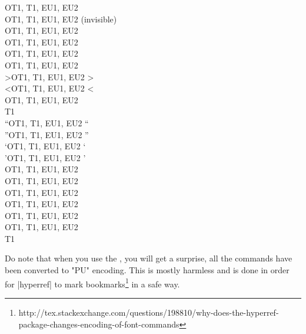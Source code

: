 \begin{tabbing}
\ttverb\textbraceright    \>OT1, T1, EU1, EU2\>   \textbraceright  \>  \\
\ttverb\textcompwordmark  \>OT1, T1, EU1, EU2\>   \textcompwordmark\> (invisible) \\
\ttverb\textdollar        \>OT1, T1, EU1, EU2\>   \textdollar      \>  \\
\ttverb\textemdash        \>OT1, T1, EU1, EU2\>   \textemdash      \>  \\
\ttverb\textendash        \>OT1, T1, EU1, EU2\>   \textendash      \>  \\
\ttverb\textexclamdown    \>OT1, T1, EU1, EU2\>   \textexclamdown  \>  \\
\ttverb\textgreater       \>OT1, T1, EU1, EU2\>   \textgreater     \>  \\
\ttverb\textless          \>OT1, T1, EU1, EU2\>   \textless        \>  \\
\ttverb\textquestiondown  \>OT1, T1, EU1, EU2\>   \textquestiondown\>  \\
\ttverb\textquotedbl      \>T1    \>   \textquotedbl    \>  \\
\ttverb\textquotedblleft  \>OT1, T1, EU1, EU2\>   \textquotedblleft\>  \\
\ttverb\textquotedblright \>OT1, T1, EU1, EU2\>   \textquotedblright\> \\
\ttverb\textquoteleft     \>OT1, T1, EU1, EU2\>   \textquoteleft   \>  \\
\ttverb\textquoteright    \>OT1, T1, EU1, EU2\>   \textquoteright  \>  \\
\ttverb\textregistered    \>OT1, T1, EU1, EU2\>   \textregistered  \>  \\
\ttverb\textsection       \>OT1, T1, EU1, EU2\>   \textsection     \>  \\
\ttverb\textsterling      \>OT1, T1, EU1, EU2\>   \textsterling    \>  \\
\ttverb\texttrademark     \>OT1, T1, EU1, EU2\>   \texttrademark   \>  \\
\ttverb\textunderscore    \>OT1, T1, EU1, EU2\>   \textunderscore  \>  \\
\ttverb\textvisiblespace  \>OT1, T1, EU1, EU2\>   \textvisiblespace\>  \\
\ttverb\th                \>T1    \>   \th              \>
\end{tabbing}                        

Do note that when you use the , you will get a surprise, all the commands have been converted to "PU" encoding. This is mostly harmless and is  done in order for |hyperref| to mark bookmarks\footnote{http://tex.stackexchange.com/questions/198810/why-does-the-hyperref-package-changes-encoding-of-font-commands} in a safe way.

